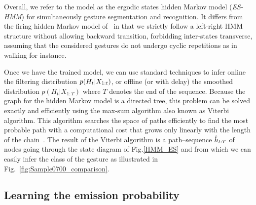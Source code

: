 Overall, we refer to the model as the ergodic states hidden Markov model (\emph{ES-HMM}) for simultaneously gesture segmentation and recognition. It  differs from the firing hidden Markov model of~\cite{nowozin2012action} in that we strictly follow a left-right HMM structure without allowing backward transition, forbidding inter-states transverse, assuming that the considered gestures do not undergo cyclic repetitions as in walking for instance.




Once we have the trained model, we can use standard techniques to infer online the filtering 
distribution $p(H_t | X_{1:t})$,  or offline (or with delay) 
the smoothed distribution $p(H_t | X_{1:T})$ where $T$ denotes the end of the sequence.
Because the graph for the hidden Markov model is a directed tree, this problem can be solved exactly and efficiently using the max-sum algorithm also known as Viterbi algorithm. This algorithm searches the space of paths efficiently to find the most probable path with a computational cost that grows only linearly with the length of the chain~\cite{bishop2006pattern}.
The result of the Viterbi algorithm is a path--sequence $\hat{h}_{t:T}$ of nodes going through the state diagram of 
Fig.\ref{HMM_ES} and from which we can easily infer the class of the gesture as illustrated in Fig.~\ref{fig:Sample0700_comparison}.



\subsection{Learning the emission probability \emissionprob{}}
\label{sec:ProblemFormation}

